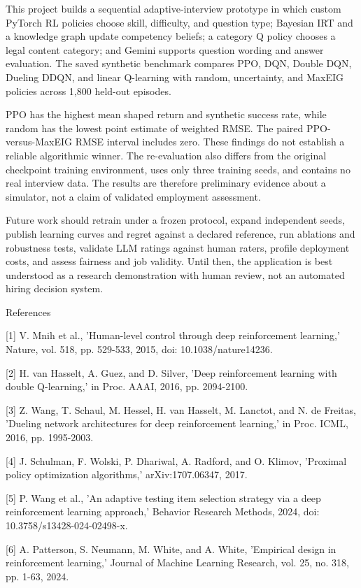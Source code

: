 \documentclass{ieeeaccess}
\begin{document}
This project builds a sequential adaptive-interview prototype in which custom PyTorch RL policies choose skill, difficulty, and question type; Bayesian IRT and a knowledge graph update competency beliefs; a category Q policy chooses a legal content category; and Gemini supports question wording and answer evaluation. The saved synthetic benchmark compares PPO, DQN, Double DQN, Dueling DDQN, and linear Q-learning with random, uncertainty, and MaxEIG policies across 1,800 held-out episodes.

PPO has the highest mean shaped return and synthetic success rate, while random has the lowest point estimate of weighted RMSE. The paired PPO-versus-MaxEIG RMSE interval includes zero. These findings do not establish a reliable algorithmic winner. The re-evaluation also differs from the original checkpoint training environment, uses only three training seeds, and contains no real interview data. The results are therefore preliminary evidence about a simulator, not a claim of validated employment assessment.

Future work should retrain under a frozen protocol, expand independent seeds, publish learning curves and regret against a declared reference, run ablations and robustness tests, validate LLM ratings against human raters, profile deployment costs, and assess fairness and job validity. Until then, the application is best understood as a research demonstration with human review, not an automated hiring decision system.

References

[1] V. Mnih et al., 'Human-level control through deep reinforcement learning,' Nature, vol. 518, pp. 529-533, 2015, doi: 10.1038/nature14236.

[2] H. van Hasselt, A. Guez, and D. Silver, 'Deep reinforcement learning with double Q-learning,' in Proc. AAAI, 2016, pp. 2094-2100.

[3] Z. Wang, T. Schaul, M. Hessel, H. van Hasselt, M. Lanctot, and N. de Freitas, 'Dueling network architectures for deep reinforcement learning,' in Proc. ICML, 2016, pp. 1995-2003.

[4] J. Schulman, F. Wolski, P. Dhariwal, A. Radford, and O. Klimov, 'Proximal policy optimization algorithms,' arXiv:1707.06347, 2017.

[5] P. Wang et al., 'An adaptive testing item selection strategy via a deep reinforcement learning approach,' Behavior Research Methods, 2024, doi: 10.3758/s13428-024-02498-x.

[6] A. Patterson, S. Neumann, M. White, and A. White, 'Empirical design in reinforcement learning,' Journal of Machine Learning Research, vol. 25, no. 318, pp. 1-63, 2024.
\end{document}
